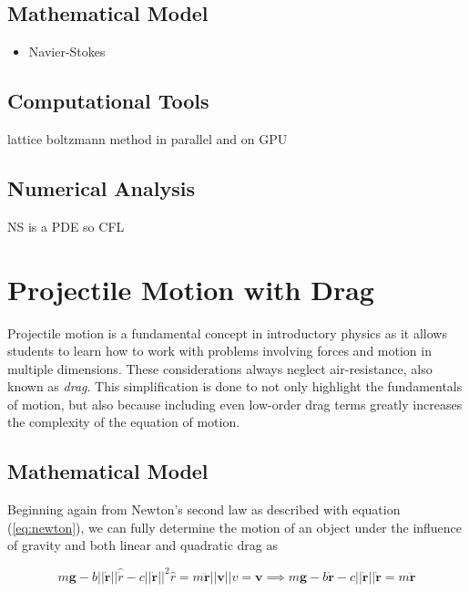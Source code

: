 \documentclass{report}
\begin{document}
        \subsection{Mathematical Model}

            \begin{itemize}
                \item Navier-Stokes
            \end{itemize}

        \subsection{Computational Tools}

            lattice boltzmann method in parallel and on GPU

        \subsection{Numerical Analysis}

            NS is a PDE so CFL

\pagebreak

    \section{Projectile Motion with Drag}

        Projectile motion is a fundamental concept in introductory physics as it allows students to learn how to work with problems involving forces and motion in multiple dimensions.  These considerations always neglect air-resistance, also known as \emph{drag}.  This simplification is done to not only highlight the fundamentals of motion, but also because including even low-order drag terms greatly increases the complexity of the equation of motion.

        \subsection{Mathematical Model}

            Beginning again from Newton's second law as described with equation (\ref{eq:newton}), we can fully determine the motion of an object under the influence of gravity and both linear and quadratic drag as\cite{taylor2005classical}

            \begin{subequations}
                \begin{equation}
                    m \mathbf{g} - b \left|\left| \dot{\mathbf{r}} \right|\right| \hat{\dot{r}} - c \left|\left|\dot{\mathbf{r}}\right|\right|^2 \hat{r} = m \ddot{\mathbf{r}}
                \end{equation}
                \begin{equation}
                    ||\mathbf{v}|| \hat{v} = \mathbf{v} \implies m \mathbf{g} - b \dot{\mathbf{r}} - c \left|\left|\dot{\mathbf{r}}\right|\right| \dot{\mathbf{r}} = m \ddot{\mathbf{r}}
                \end{equation}
            \end{subequations}
\end{document}
